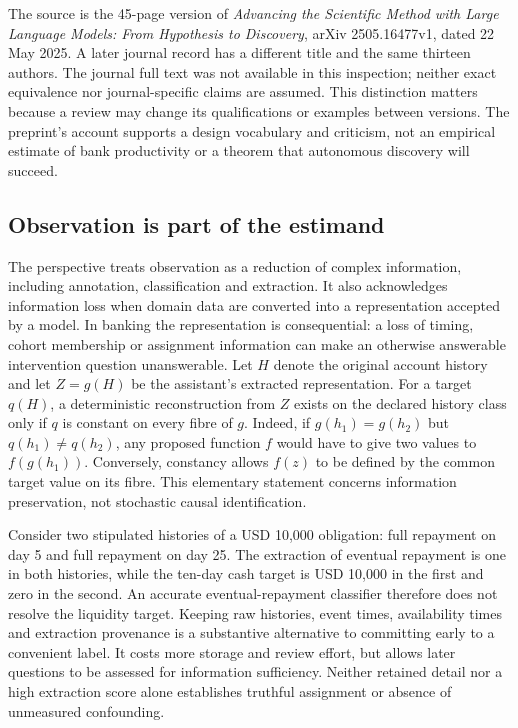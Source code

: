 The source is the 45-page version of \emph{Advancing the Scientific Method with Large
Language Models: From Hypothesis to Discovery}, arXiv 2505.16477v1, dated 22 May 2025.
A later journal record has a different title and the same thirteen authors. The
journal full text was not available in this inspection; neither exact equivalence
nor journal-specific claims are assumed. This distinction matters because a review
may change its qualifications or examples between versions. The preprint's account
supports a design vocabulary and criticism, not an empirical estimate of bank
productivity or a theorem that autonomous discovery will succeed.

\subsection{Observation is part of the estimand}

The perspective treats observation as a reduction of complex information, including
annotation, classification and extraction. It also acknowledges information loss when
domain data are converted into a representation accepted by a model. In banking the
representation is consequential: a loss of timing, cohort membership or assignment
information can make an otherwise answerable intervention question unanswerable.
Let $H$ denote the original account history and let $Z=g(H)$ be the assistant's
extracted representation. For a target $q(H)$, a deterministic reconstruction from
$Z$ exists on the declared history class only if $q$ is constant on every fibre
of $g$. Indeed, if $g(h_1)=g(h_2)$ but $q(h_1)\ne q(h_2)$, any proposed function
$f$ would have to give two values to $f(g(h_1))$. Conversely, constancy allows
$f(z)$ to be defined by the common target value on its fibre. This elementary
statement concerns information preservation, not stochastic causal identification.

Consider two stipulated histories of a USD 10,000 obligation: full repayment on
day 5 and full repayment on day 25. The extraction of eventual repayment is one
in both histories, while the ten-day cash target is USD 10,000 in the first and
zero in the second. An accurate eventual-repayment classifier therefore does not
resolve the liquidity target. Keeping raw histories, event times, availability
times and extraction provenance is a substantive alternative to committing early
to a convenient label. It costs more storage and review effort, but allows later
questions to be assessed for information sufficiency. Neither retained detail nor
a high extraction score alone establishes truthful assignment or absence of
unmeasured confounding.~\citep{exec24_scimethod_reference}

